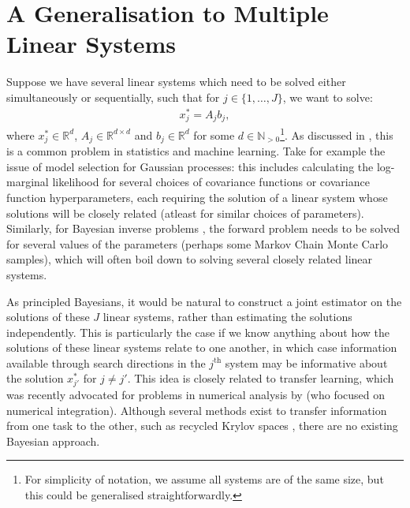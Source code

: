 \documentclass[twoside]{article}
\begin{document}






\section{A Generalisation to Multiple Linear Systems}

Suppose we have several linear systems which need to be solved either simultaneously or sequentially, such that for $j \in \{1,\ldots,J\}$, we want to solve:
\begin{align*}
x_j^* = A_j b_j,  
\end{align*}
where $x_j^* \in \mathbb{R}^d$, $A_j \in \mathbb{R}^{d \times d}$ and $b_j \in \mathbb{R}^d$ for some $d \in \mathbb{N}_{> 0}$\footnote{For simplicity of notation, we assume all systems are of the same size, but this could be generalised straightforwardly.}. As discussed in 
\cite{DeRoos2017}, this is a common problem in statistics and machine learning. Take for example the issue of model selection for Gaussian processes: this includes calculating the log-marginal likelihood for several choices of covariance functions or covariance function hyperparameters, each requiring the solution of a linear system whose solutions will be closely related (atleast for similar choices of parameters). Similarly, for Bayesian inverse problems \citep{Dashti2017}, the forward problem needs to be solved for several values of the parameters (perhaps some Markov Chain Monte Carlo samples), which will often boil down to solving several closely related linear systems.

As principled Bayesians, it would be natural to construct a joint estimator on the solutions of these $J$ linear systems, rather than estimating the solutions independently. This is particularly the case if we know anything about how the solutions of these linear systems relate to one another, in which case information available through search directions in the $j^{\text{th}}$ system may be informative about the solution $x^*_{j'}$ for $j \neq j'$. This idea is closely related to transfer learning, which was recently advocated for problems in numerical analysis by \cite{Xi2018MultiOutput} (who focused on numerical integration). Although several methods exist to transfer information from one task to the other, such as recycled Krylov spaces \citep{DeRoos2017}, there are no existing Bayesian approach. 
\end{document}
